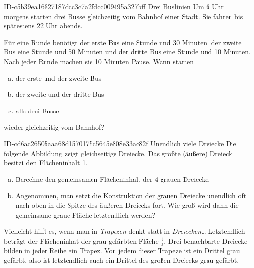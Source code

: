 \begin{exercise}
      {ID-c5b39ea16827187dcc3c7a2fdcc009495a327bff}
      {Drei Buslinien}
  \ifproblem\problem
    Um 6 Uhr morgens starten drei Busse gleichzeitig vom Bahnhof einer Stadt.
    Sie fahren bis spätestens 22 Uhr abends.\par
    Für eine Runde benötigt
    der erste Bus eine Stunde und 30 Minuten,
    der zweite Bus eine Stunde und 50 Minuten und
    der dritte Bus eine Stunde und 10 Minuten.
    Nach jeder Runde machen sie 10 Minuten Pause.
    Wann starten
    \begin{enumerate}[a)]
      \item der erste und der zweite Bus
      \item der zweite und der dritte Bus
      \item alle drei Busse
    \end{enumerate}
    wieder gleichzeitig vom Bahnhof?
  \fi
\end{exercise}

\begin{exercise}
      {ID-cd6ac26505aaa68d1570175c5645e808e33ac82f}
      {Unendlich viele Dreiecke}
  \newcommand{\topdowntriangle}[3]
  {%
    \filldraw[fill=black!40!white] (#1, #2) -- ++(60:#3) -- ++(180:#3) -- cycle;
  }%
  \ifproblem\problem
    Die folgende Abbildung zeigt gleichseitige Dreiecke. Das größte (äußere) Dreieck
    besitzt den Flächeninhalt 1.
    \begin{center}
    \end{center}
    \begin{enumerate}[a)]
      \item Berechne den gemeinsamen Flächeninhalt der 4 grauen Dreiecke.
      \item Angenommen, man setzt die Konstruktion der grauen Dreiecke
            unendlich oft nach oben in die Spitze des äußeren Dreiecks fort.
            Wie groß wird dann die gemeinsame graue Fläche letztendlich werden?
    \end{enumerate}
  \fi
  \ifoutline\outline
    Vielleicht hilft es, wenn man in \textit{Trapezen} denkt statt in \textit{Dreiecken}\ldots
  \fi
  \ifoutcome\outcome
    Letztendlich beträgt der Flächeninhat der grau gefärbten Fläche $\frac{1}{3}$.
    Drei benachbarte Dreiecke bilden in jeder \glqq Reihe\grqq{} ein Trapez.
    Von jedem dieser Trapeze ist ein Drittel grau gefärbt, also ist letztendlich
    auch ein Drittel des großen Dreiecks grau gefärbt.
  \fi
\end{exercise}


